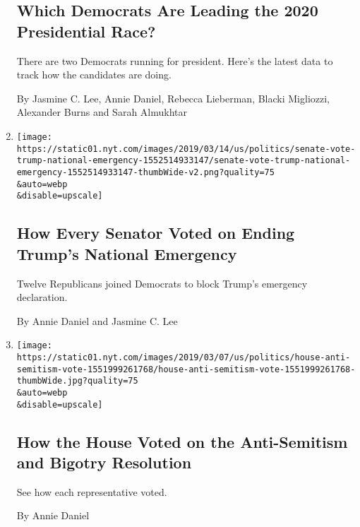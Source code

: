 \begin{enumerate}
{  \subsection{Which Democrats Are Leading the 2020 Presidential
  Race?}\label{which-democrats-are-leading-the-2020-presidential-race}}

  There are two Democrats running for president. Here's the latest data
  to track how the candidates are doing.

  By Jasmine C. Lee, Annie Daniel, Rebecca Lieberman, Blacki Migliozzi,
  Alexander Burns and Sarah Almukhtar
\item
  \href{/interactive/2019/03/14/us/politics/senate-vote-trump-national-emergency.html}{}

  \texttt{[image: https://static01.nyt.com/images/2019/03/14/us/politics/senate-vote-trump-national-emergency-1552514933147/senate-vote-trump-national-emergency-1552514933147-thumbWide-v2.png?quality=75\\\&auto=webp\\\&disable=upscale]}

  \hypertarget{how-every-senator-voted-on-ending-trumps-national-emergency}{%
  \subsection{How Every Senator Voted on Ending Trump's National
  Emergency}\label{how-every-senator-voted-on-ending-trumps-national-emergency}}

  Twelve Republicans joined Democrats to block Trump's emergency
  declaration.

  By Annie Daniel and Jasmine C. Lee
\item
  \href{/interactive/2019/03/07/us/politics/house-anti-semitism-vote.html}{}

  \texttt{[image: https://static01.nyt.com/images/2019/03/07/us/politics/house-anti-semitism-vote-1551999261768/house-anti-semitism-vote-1551999261768-thumbWide.jpg?quality=75\\\&auto=webp\\\&disable=upscale]}

  \hypertarget{how-the-house-voted-on-the-anti-semitism-and-bigotry-resolution}{%
  \subsection{How the House Voted on the Anti-Semitism and Bigotry
  Resolution}\label{how-the-house-voted-on-the-anti-semitism-and-bigotry-resolution}}

  See how each representative voted.

  By Annie Daniel
\end{enumerate}

